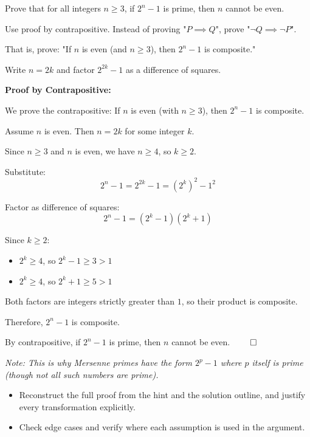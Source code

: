 
\begin{problem}
Prove that for all integers $n \geq 3$, if $2^n - 1$ is prime, then $n$ cannot be even.
\end{problem}

\begin{hint}
Use proof by contrapositive. Instead of proving "$P \implies Q$", prove "$\neg Q \implies \neg P$".

That is, prove: "If $n$ is even (and $n \geq 3$), then $2^n - 1$ is composite."

Write $n = 2k$ and factor $2^{2k} - 1$ as a difference of squares.
\end{hint}

\begin{solution}
\textbf{Proof by Contrapositive:}

We prove the contrapositive: If $n$ is even (with $n \geq 3$), then $2^n - 1$ is composite.

Assume $n$ is even. Then $n = 2k$ for some integer $k$.

Since $n \geq 3$ and $n$ is even, we have $n \geq 4$, so $k \geq 2$.

Substitute:
\[
2^n - 1 = 2^{2k} - 1 = (2^k)^2 - 1^2
\]

Factor as difference of squares:
\[
2^n - 1 = (2^k - 1)(2^k + 1)
\]

Since $k \geq 2$:
\begin{itemize}
\item $2^k \geq 4$, so $2^k - 1 \geq 3 > 1$
\item $2^k \geq 4$, so $2^k + 1 \geq 5 > 1$
\end{itemize}

Both factors are integers strictly greater than $1$, so their product is composite.

Therefore, $2^n - 1$ is composite.

\vspace{0.3cm}

By contrapositive, if $2^n - 1$ is prime, then $n$ cannot be even. $\qed$

\vspace{0.3cm}

\textit{Note: This is why Mersenne primes have the form $2^p - 1$ where $p$ itself is prime (though not all such numbers are prime).}
\end{solution}

\begin{takeaways}
\begin{itemize}[leftmargin=*]
\item Reconstruct the full proof from the hint and the solution outline, and justify every transformation explicitly.
\item Check edge cases and verify where each assumption is used in the argument.
\end{itemize}
\end{takeaways}
